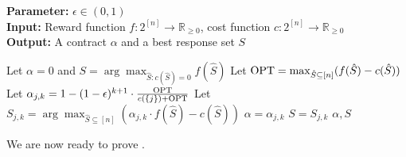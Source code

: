 \documentclass[11pt]{article}
\newcommand{\reals}{\mathbb{R}}
\begin{document}
\begin{algorithm}
\caption{FPTAS for a single agent using value and demand oracles}\label{alg:fptas}
   \hspace*{\algorithmicindent} \textbf{Parameter:}  $\epsilon \in (0,1) $ \\
   \hspace*{\algorithmicindent} \textbf{Input:} Reward function $f:2^{[n]} \rightarrow \reals_{\geq 0}$, cost function $c:2^{[n]} \rightarrow \reals_{\geq 0}$ \\
    \hspace*{\algorithmicindent} \textbf{Output:}  A contract $\alpha$ and a best response set $S$ 
\begin{algorithmic}[1]
\State Let $\alpha =0$ and $S = \arg\max_{\hat{S}: c(\hat{S}) = 0} f(\hat{S})$ \label{st:init}
\State Let $\text{OPT} = \max_{\hat{S} \subseteq [n]} (f(\hat{S}) - c(\hat{S}))$ \label{st:opt}
\State Let $\alpha_{j, k} = 1 - (1-\epsilon)^{k+1} \cdot  \frac{\text{OPT}}{ c(\{j\}) + \text{OPT}}$
\State Let $S_{j,k} = \arg\max_{\hat{S}\subseteq [n]}  \left(\alpha_{j,k} \cdot  f(\hat{S}) - c(\hat{S})\right)$ \label{st:br}
\State $\alpha=\alpha_{j, k}$
\State $S= S_{j,k}$
\EndIf
\EndFor
\EndFor
\State \Return $\alpha,S$
\end{algorithmic}
\end{algorithm}

We are now ready to prove .
\end{document}
